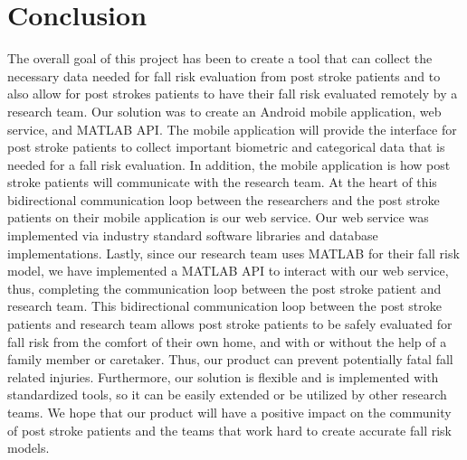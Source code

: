 \documentclass[conference]{IEEEtran}
\begin{document}
\section{Conclusion}

The overall goal of this project has been to create a tool that can collect the necessary data needed for fall risk evaluation from post stroke patients and to also allow for post strokes patients to have their fall risk evaluated remotely by a research team. Our solution was to create an Android mobile application, web service, and MATLAB API. The mobile application will provide the interface for post stroke patients to collect important biometric and categorical data that is needed for a fall risk evaluation. In addition, the mobile application is how post stroke patients will communicate with the research team. At the heart of this bidirectional communication loop between the researchers and the post stroke patients on their mobile application is our web service. Our web service was implemented via industry standard software libraries and database implementations. Lastly, since our research team uses MATLAB for their fall risk model, we have implemented a MATLAB API to interact with our web service, thus, completing the communication loop between the post stroke patient and research team. This bidirectional communication loop between the post stroke patients and research team allows post stroke patients to be safely evaluated for fall risk from the comfort of their own home, and with or without the help of a family member or caretaker. Thus, our product can prevent potentially fatal fall related injuries. Furthermore, our solution is flexible and is implemented with standardized tools, so it can be easily extended or be utilized by other research teams. We hope that our product will have a positive impact on the community of post stroke patients and the teams that work hard to create accurate fall risk models.



\end{document}

